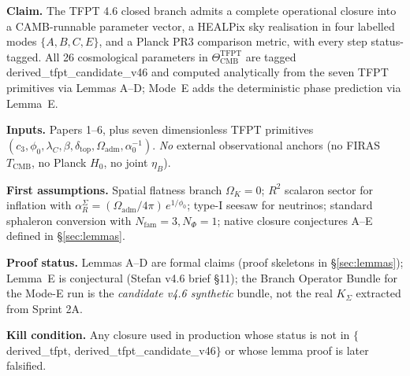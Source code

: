 \begin{tfptclaimcontract}
\textbf{Claim.} The TFPT 4.6 closed branch admits a complete
operational closure into a CAMB-runnable parameter vector, a HEALPix
sky realisation in four labelled modes \(\{A,B,C,E\}\), and a Planck
PR3 comparison metric, with every step status-tagged.  All 26
cosmological parameters in
\(\Theta_{\mathrm{CMB}}^{\mathrm{TFPT}}\) are tagged
\textsf{derived\_tfpt\_candidate\_v46} and computed analytically from
the seven TFPT primitives via Lemmas A--D; Mode~E adds the
deterministic phase prediction via Lemma~E.
\par
\textbf{Inputs.} Papers 1--6, plus seven dimensionless TFPT primitives
\((c_3,\phi_0,\lambda_C,\beta,\delta_{\mathrm{top}},
\Omega_{\mathrm{adm}},\alpha_0^{-1})\). \emph{No} external observational
anchors (no FIRAS \(T_{\mathrm{CMB}}\), no Planck \(H_0\), no joint
\(\eta_B\)).
\par
\textbf{First assumptions.} Spatial flatness branch \(\Omega_K=0\);
\(R^2\) scalaron sector for inflation with
\(\alpha_R^\Sigma=(\Omega_{\mathrm{adm}}/4\pi)\,e^{1/\phi_0}\);
type-I seesaw for neutrinos; standard sphaleron conversion with
\(N_{\mathrm{fam}}=3,N_\Phi=1\); native closure conjectures A--E
defined in \S\ref{sec:lemmas}.
\par
\textbf{Proof status.} Lemmas A--D are formal claims (proof skeletons
in \S\ref{sec:lemmas}); Lemma~E is conjectural (Stefan v4.6 brief
\S11); the Branch Operator Bundle for the Mode-E run is the
\emph{candidate v4.6 synthetic} bundle, not the real
\(K_\Sigma\) extracted from Sprint 2A.
\par
\textbf{Kill condition.} Any closure used in production whose status
is not in \(\{\)\textsf{derived\_tfpt}, \textsf{derived\_tfpt\_candidate\_v46}\(\}\)
or whose lemma proof is later falsified.
\par
\end{tfptclaimcontract}

